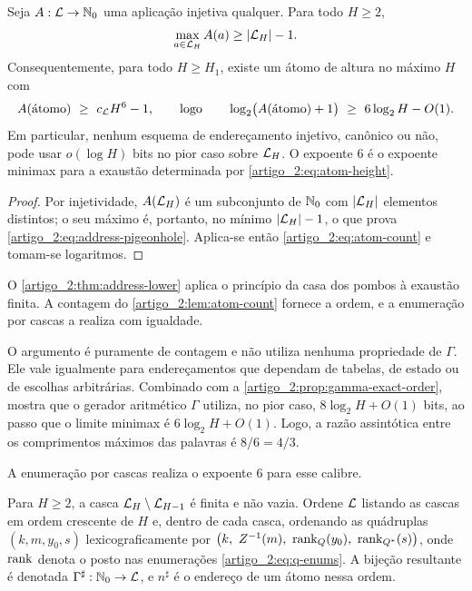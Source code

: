 \begin{theorem}\label{map:artigo_2:3.4}\label{artigo_2:thm:address-lower}
Seja $A:\mathcal{L}\to\mathbb{N}_0$ uma aplicação injetiva qualquer. Para todo $H\ge2$,
\begin{equation}
 \max_{a\in\mathcal{L}_H}A(a)\ge |\mathcal{L}_H|-1.
 \label{artigo_2:eq:address-pigeonhole}
\end{equation}
Consequentemente, para todo $H\ge H_1$, existe um átomo de altura no máximo
$H$ com
\begin{equation}
 A(\text{átomo})\ \ge\ c_{\mathcal{L}} H^6-1,
 \qquad\text{logo}\qquad
 \log_2\bigl(A(\text{átomo})+1\bigr)\ \ge\ 6\log_2H-O(1).
 \label{artigo_2:eq:address-lower}
\end{equation}
Em particular, nenhum esquema de endereçamento injetivo, canônico ou não,
pode usar $o(\log H)$ bits no pior caso sobre $\mathcal{L}_H$. O expoente $6$ é
o expoente minimax para a exaustão determinada por \eqref{artigo_2:eq:atom-height}.
\end{theorem}

\begin{proof}
Por injetividade, $A(\mathcal{L}_H)$ é um subconjunto de $\mathbb{N}_0$ com
$|\mathcal{L}_H|$ elementos distintos; o seu máximo é, portanto, no mínimo
$|\mathcal{L}_H|-1$, o que prova \eqref{artigo_2:eq:address-pigeonhole}. Aplica-se então
\eqref{artigo_2:eq:atom-count} e tomam-se logaritmos.
\end{proof}

O \cref{artigo_2:thm:address-lower} aplica o princípio da casa dos pombos à exaustão finita. A contagem do \cref{artigo_2:lem:atom-count} fornece a ordem, e a enumeração por cascas a realiza com igualdade.

\begin{remark}\label{map:artigo_2:3.5}
O argumento é puramente de contagem e não utiliza nenhuma propriedade de $\Gamma$. Ele vale igualmente para endereçamentos que dependam de tabelas, de estado ou de escolhas arbitrárias. Combinado com a \cref{artigo_2:prop:gamma-exact-order}, mostra que o gerador aritmético $\Gamma$ utiliza, no pior caso, $8\log_2H+O(1)$ bits, ao passo que o limite minimax é $6\log_2H+O(1)$. Logo, a razão assintótica entre os comprimentos máximos das palavras é $8/6=4/3$.
\end{remark}

A enumeração por cascas realiza o expoente $6$ para esse calibre.

\begin{definition}\label{map:artigo_2:3.6}\label{artigo_2:def:sharp}
Para $H\ge2$, a casca $\mathcal{L}_H\setminus\mathcal{L}_{H-1}$ é finita e não vazia. Ordene $\mathcal{L}$ listando as cascas em ordem crescente de $H$ e, dentro de cada casca, ordenando as quádruplas $(k,m,y_0,s)$ lexicograficamente por $\bigl(k,\ Z^{-1}(m),\ \rank_Q(y_0),\ \rank_{Q^*}(s)\bigr)$, onde $\operatorname{rank}$ denota o posto nas enumerações \eqref{artigo_2:eq:q-enums}. A bijeção resultante é denotada $\Gamma^\sharp:\mathbb{N}_0\to\mathcal{L}$, e $n^\sharp$ é o endereço de um átomo nessa ordem.
\end{definition}

